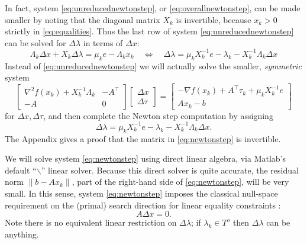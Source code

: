 \documentclass[11pt]{article}
\newcommand{\grad}{\nabla}
\begin{document}
In fact, system \eqref{eq:unreducednewtonstep}, or \eqref{eq:overallnewtonstep}, can be made smaller by noting that the diagonal matrix $X_k$ is invertible, because $x_k>0$ strictly in \eqref{eq:equalities}.  Thus the last row of system \eqref{eq:unreducednewtonstep} can be solved for $\Delta\lambda$ in terms of $\Delta x$:
\begin{equation}
\Lambda_k\Delta x + X_k\Delta \lambda = \mu_k e - \Lambda_k x_k \quad \iff \quad
\Delta\lambda = \mu_k X_k^{-1} e - \lambda_k - X_k^{-1} \Lambda_k \Delta x \label{eq:solvefordlam}
\end{equation}
Instead of \eqref{eq:unreducednewtonstep} we will actually solve the smaller, \emph{symmetric} system
\begin{equation}
\begin{bmatrix}
\grad^2 f(x_k) + X_k^{-1}\Lambda_k & -A^\top \\
-A             & 0
\end{bmatrix}
\begin{bmatrix}
\Delta x \\
\Delta \tau
\end{bmatrix}
=
\begin{bmatrix}
-\grad f(x_k) + A^\top \tau_k + \mu_k X_k^{-1} e \\
A x_k - b
\end{bmatrix} \label{eq:newtonstep}
\end{equation}
for $\Delta x,\Delta\tau$, and then complete the Newton step computation by assigning
\begin{equation}
\Delta\lambda = \mu_k X_k^{-1} e - \lambda_k - X_k^{-1} \Lambda_k \Delta x. \label{eq:newtonsteplam}
\end{equation}
The Appendix gives a proof that the matrix in \eqref{eq:newtonstep} is invertible.

We will solve system \eqref{eq:newtonstep} using direct linear algebra, via Matlab's default ``$\backslash$'' linear solver.  Because this direct solver is quite accurate, the residual norm $\|b-A x_k\|$, part of the right-hand side of \eqref{eq:newtonstep}, will be very small.  In this sense, system \eqref{eq:newtonstep} imposes the classical null-space requirement on the (primal) search direction for linear equality constraints \cite[chapter 3]{GrivaNashSofer2009}:
\begin{equation}
A \Delta x = 0.  \label{eq:dxnull}
\end{equation}
Note there is no equivalent linear restriction on $\Delta\lambda$; if $\lambda_k\in T^o$ then $\Delta\lambda$ can be anything.
\end{document}
